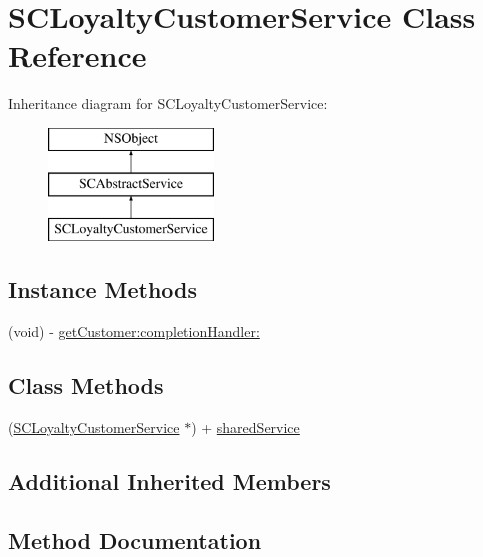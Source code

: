\hypertarget{interface_s_c_loyalty_customer_service}{}\section{S\+C\+Loyalty\+Customer\+Service Class Reference}
\label{interface_s_c_loyalty_customer_service}
Inheritance diagram for S\+C\+Loyalty\+Customer\+Service\+:\begin{figure}[H]
\begin{center}
\leavevmode
\includegraphics[height=3.000000cm]{interface_s_c_loyalty_customer_service}
\end{center}
\end{figure}
\subsection*{Instance Methods}
\begin{DoxyCompactItemize}
\item 
(void) -\/ \hyperlink{interface_s_c_loyalty_customer_service_a8760104cc1b8eb9f6bcfe8e45ae4fcbc}{get\+Customer\+:completion\+Handler\+:}
\end{DoxyCompactItemize}
\subsection*{Class Methods}
\begin{DoxyCompactItemize}
\item 
(\hyperlink{interface_s_c_loyalty_customer_service}{S\+C\+Loyalty\+Customer\+Service} $\ast$) + \hyperlink{interface_s_c_loyalty_customer_service_a479f1a1e1ef6a2932051e954ce5aacf6}{shared\+Service}
\end{DoxyCompactItemize}
\subsection*{Additional Inherited Members}


\subsection{Method Documentation}
